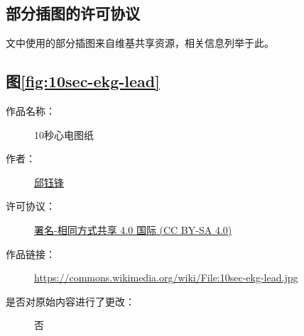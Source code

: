 \documentclass{ecnuthesis}
\begin{document}


    \backmatter
    \PrintReference

    \begin{appendix}

        \begingroup
        \renewcommand{\clearpage}{\relax}
        \listoftodos
        \endgroup

        \listoffigures
        \listoffigureEng


        \chapter*{部分插图的许可协议}\label{ch:license}

        文中使用的部分插图来自维基共享资源，相关信息列举于此。

        \section*{图\ref{fig:10sec-ekg-lead}}

        \begin{description}
            \item[作品名称：]10秒心电图纸
            \item[作者：]\href{https://zh.wikipedia.org/wiki/User:Kuyohong}{邱钰锋}
            \item[许可协议：]\href{https://creativecommons.org/licenses/by/4.0/}{署名-相同方式共享 4.0 国际 (CC BY-SA 4.0)}
            \item[作品链接：]\url{https://commons.wikimedia.org/wiki/File:10sec-ekg-lead.jpg}
            \item[是否对原始内容进行了更改：]否
        \end{description}

    \end{appendix}

    \begin{acknowledgement}
    \end{acknowledgement}
\end{document}
